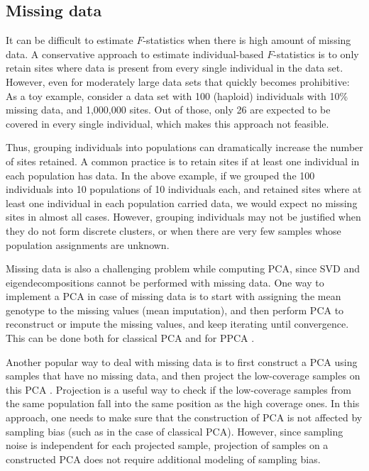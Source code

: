 \documentclass[12pt]{article}
\begin{document}
\subsection{Missing data}

It can be difficult to estimate $F$-statistics when there is high amount of missing data. A conservative approach to estimate individual-based $F$-statistics is to only retain sites where data is present from every single individual in the data set. However, even for moderately large data sets that quickly becomes prohibitive: As a toy example, consider a data set with 100 (haploid) individuals with 10\% missing data, and 1,000,000 sites. Out of those, only 26 are expected to be covered in every single individual, which makes this approach not feasible.

Thus, grouping individuals into populations can dramatically increase the number of sites retained. A common practice is to retain sites if at least one individual in each population has data. In the above example, if we grouped the 100 individuals into 10 populations of 10 individuals each, and retained sites where at least one individual in each population carried data, we would expect no missing sites in almost all cases. However, grouping individuals may not be justified when they do not form discrete clusters, or when there are very few samples whose population assignments are unknown.

Missing data is also a challenging problem while computing PCA, since SVD and eigendecompositions cannot be performed with missing data. One way to implement a PCA in case of missing data is to start with assigning the mean genotype to the missing values (mean imputation), and then perform PCA to reconstruct or impute the missing values, and keep iterating until convergence. This can be done both for classical PCA \citep{meisner_large-scale_2021} and for PPCA \citep{tipping_probabilistic_1999-1}.  

Another popular way to deal with missing data is to first construct a PCA using samples that have no missing data, and then project the low-coverage samples on this PCA \citep{patterson_population_2006, price_principal_2006}. Projection is a useful way to check if the low-coverage samples from the same population fall into the same position as the high coverage ones. In this approach, one needs to make sure that the construction of PCA is not affected by sampling bias (such as in the case of classical PCA). However, since sampling noise is independent for each projected sample, projection of samples on a constructed PCA does not require additional modeling of sampling bias. 
\end{document}
